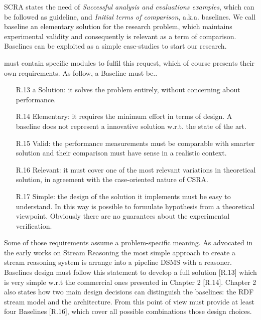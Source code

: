 SCRA states the need of \textit{Successful analysis and evaluations examples}, which can be followed as guideline, and \textit{Initial terms of comparison}, a.k.a. baselines. We call baseline  an elementary solution for the research problem, which maintains experimental validity and consequently is relevant as a term of comparison. Baselines can be exploited as a simple case-studies to start our research.

\name must contain specific modules to fulfil this request, which of course presents their own requirements. As follow, a Baseline must be.. 

\begin{enumerate}
\item[R.13] a Solution: it solves the problem entirely, without concerning about performance. %
\item[R.14] Elementary: it requires the minimum effort in terms of design. A baseline does not represent a innovative solution w.r.t. the state of the art.  %
\item[R.15] Valid: the performance measurements must be comparable with smarter solution and their comparison must have sense in a realistic context. %
\item[R.16] Relevant: it must cover one of the most relevant variations in theoretical solution, in agreement with the case-oriented nature of CSRA. %
\item[R.17] Simple: the design of the solution it implements must be easy to understand. In this way is possible to formulate hypothesis from a theoretical viewpoint. Obviously there are no guarantees about the experimental verification.  %
\end{enumerate}

Some of those requirements assume a problem-specific meaning. As advocated in the early works on Stream Reasoning \cite{1,2} the most simple approach to create a stream reasoning system is arrange into a pipeline DSMS with a reasoner. Baselines design must follow this statement to develop a full solution [R.13] which is very simple w.r.t the commercial ones presented in Chapter 2 [R.14]. Chapter 2 also states how two main design decisions can distinguish the baselines: the RDF stream model and the architecture. From this point of view \name must provide at least four Baselines [R.16], which cover all possible combinations those design choices.


